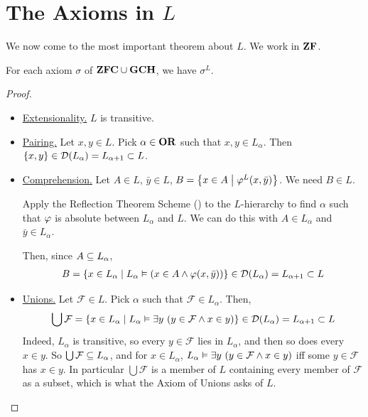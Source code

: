 \section{The Axioms in $L$}

We now come to the most important theorem about $L$. We work in $\mathbf{ZF}$.

\begin{boxtheorem}[Gödel] \label{Ch4:Thm:Godel}
    For each axiom $\sigma$ of $\mathbf{ZFC} \cup \mathbf{GCH}$, we have $\sigma^{L}$.
\end{boxtheorem}
\begin{proof}
    \hfill
    \begin{itemize}
        \item \underline{Extensionality.} $L$ is transitive.

        \item \underline{Pairing.} Let $x, y \in L$. Pick $\alpha \in \mathbf{OR}$ such that $x, y \in L_{\alpha}$. Then $\left\{ x, y \right\} \in \mathcal{D}\!\left( L_{\alpha} \right) = L_{\alpha + 1} \subset L$.

        \item \underline{Comprehension.} Let $A \in L$, $\bar{y} \in L$, $B = \left\{ x \in A \; \middle\vert \; \varphi^L\!\left( x, \bar{y} \right) \right\}$. We need $B \in L$.

        Apply the Reflection Theorem Scheme () to the $L$-hierarchy to find $\alpha$ such that $\varphi$ is absolute between $L_{\alpha}$ and $L$. We can do this with $A \in L_{\alpha}$ and $\bar{y} \in L_{\alpha}$.

        Then, since $A \subseteq L_{\alpha}$,
        \begin{align*}
            B
            = \left\{ x \in L_{\alpha} \; \middle\vert \; L_{\alpha} \vDash \left( x \in A \land \varphi\!\left( x, \bar{y} \right) \right) \right\}
            \in \mathcal{D}\!\left( L_{\alpha} \right) = L_{\alpha + 1} \subset L
        \end{align*}

        \item \underline{Unions.} Let $\mathcal{F} \in L$. Pick $\alpha$ such that $\mathcal{F} \in L_{\alpha}$. Then,
        \begin{align*}
            \bigcup \mathcal{F}
            = \left\{ x \in L_{\alpha} \; \middle\vert \; L_{\alpha} \vDash \exists y \, \left( y \in \mathcal{F} \land x \in y \right) \right\}
            \in \mathcal{D}\!\left( L_{\alpha} \right) = L_{\alpha + 1} \subset L
        \end{align*}
        Indeed, $L_{\alpha}$ is transitive, so every $y \in \mathcal{F}$ lies in $L_{\alpha}$, and then so does every $x \in y$. So $\bigcup \mathcal{F} \subseteq L_{\alpha}$, and for $x \in L_{\alpha}$, $L_{\alpha} \vDash \exists y \, \left( y \in \mathcal{F} \land x \in y \right)$ iff some $y \in \mathcal{F}$ has $x \in y$. In particular $\bigcup \mathcal{F}$ is a member of $L$ containing every member of $\mathcal{F}$ as a subset, which is what the Axiom of Unions asks of $L$.


\end{itemize}
\end{proof}
